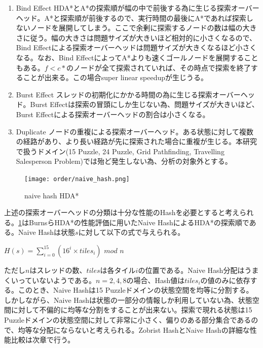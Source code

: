 \documentclass{jsarticle}
\begin{document}
\begin{enumerate}
\item Bind Effect
\newline
HDA*とA*の探索順が幅の中で前後する為に生じる探索オーバーヘッド。A*と探索順が前後するので、実行時間の最後にA*であれば探索しないノードを展開してしまう。ここで余剰に探索するノードの数は幅の大きさに従う。幅の大きさは問題サイズが大きいほど相対的に小さくなるので、Bind Effectによる探索オーバーヘッドは問題サイズが大きくなるほど小さくなる。なお、Bind EffectによってA*よりも速くゴールノードを展開することもある。$f < c*$のノードが全て探索されていれば、その時点で探索を終了することが出来る。この場合super linear speedupが生じうる。
\newline

\item Burst Effect
\newline
スレッドの初期化にかかる時間の為に生じる探索オーバーヘッド。Burst Effectは探索の冒頭にしか生じない為、問題サイズが大きいほど、Burst Effectによる探索オーバーヘッドの割合は小さくなる。
\newline

\item Duplicate
\newline
ノードの重複による探索オーバーヘッド。ある状態に対して複数の経路があり、より長い経路が先に探索された場合に重複が生じる。本研究で扱うドメイン(15 Puzzle, 24 Puzzle, Grid Pathfinding, Travelling Salesperson Problem)では殆ど発生しない為、分析の対象外とする。

\end{enumerate}

\begin{figure}
	\centering
	\texttt{[image: order/naive\_hash.png]}
	\label{fig:order:naive_hash}
	\caption{naive hash HDA*}
\end{figure}

上述の探索オーバーヘッドの分類は十分な性能のHashを必要とすると考えられる。\ref{fig:order:naive_hash}はBurnsらHDA*の性能評価に用いたNaive HashによるHDA*の探索順である。Naive Hashは状態$s$に対して以下の式で与えられる。

$H(s) = \sum\nolimits_{i = 0}^{15}(16^{i} \times tiles_{i})$ $mod$ $n$

ただし$n$はスレッドの数、$tiles$は各タイル$i$の位置である。Naive Hash分配はうまくいっていないようである。$n = 2, 4, 8$の場合、Hash値は$tiles_{i}$の値のみに依存する。このとき、Naive Hashは15 Puzzleドメインの状態空間を均等に分割する。しかしながら、Naive Hashは状態の一部分の情報しか利用していない為、状態空間に対して不偏的に均等な分割をすることが出来ない。探索で現れる状態は15 Puzzleドメインの状態空間に対して非常に小さく、偏りのある部分集合であるので、均等な分配にならないと考えられる。Zobrist HashとNaive Hashの詳細な性能比較は次章で行う。
\end{document}
